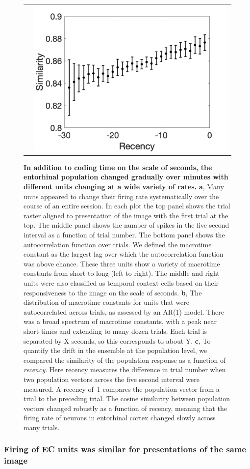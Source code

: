 \documentclass{apa}
\begin{document}
\begin{figure}
\begin{tabular}{l l }
&\includegraphics[width = .48\textwidth]{figs/Rec.png}
\end{tabular}
\caption{ \textbf{In addition to coding time on the scale of seconds, the
entorhinal population changed gradually over minutes with different units
changing at a wide variety of rates.}
\textbf{a}, Many units appeared to change their firing rate
systematically over the course of an entire session.   In each plot the top
panel shows the trial raster aligned to presentation of the image with the
first trial at the top.  The middle panel shows the number of spikes in the
five second interval as a function of trial number.  The bottom panel shows
the autocorrelation function over trials. We defined the macrotime constant
as the largest lag over which the autocorrelation function was above chance.
These three units show a variety of macrotime constants from short to long
(left to right).  The middle and right units were also classified as temporal
context cells based on their responsiveness to the image on the scale of
seconds.
\textbf{b}, The distribution of macrotime constants for units that were
autocorrelated across trials, as assessed by an AR(1) model.  There was a
broad spectrum of macrotime constants, with a peak near short times and
extending to many dozen trials.  Each trial is separated by X seconds, so this
corresponds to about Y.
\textbf{c},  To quantify the drift in the ensemble at the population level, we compared
the similarity of the population response as a function of  \emph{recency}.
Here recency measures the difference in trial number 
when two  population vectors across the five second interval were measured.  A
recency of~1 compares the population vector from a trial to the preceding
trial.  The cosine similarity between population vectors
changed robustly as a function of recency, meaning that the firing
rate of neurons in entorhinal cortex changed slowly across many  trials.
\label{fig:Rec}
} 
\end{figure}

\subsubsection{Firing of EC units was similar for presentations of the same
image}
\end{document}
